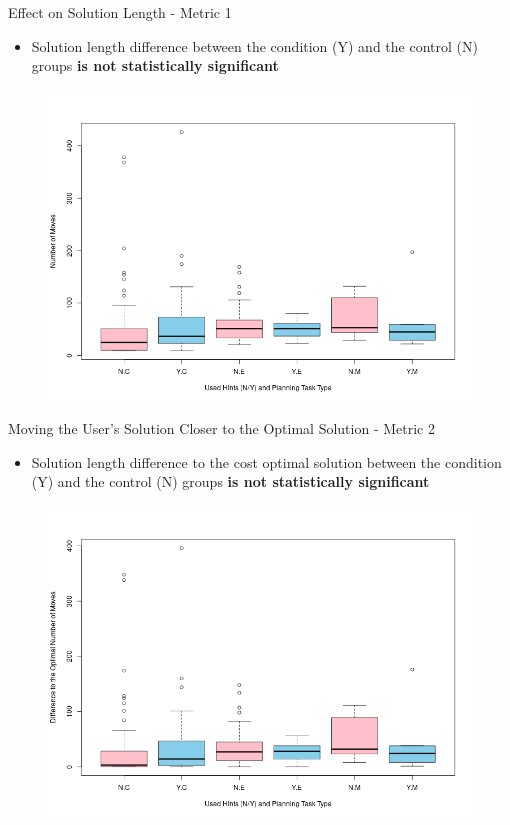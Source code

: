 \begin{frame}{Effect on Solution Length - Metric 1}

\begin{itemize}
\item Solution length difference between the condition (Y) and the control (N) groups \textbf{is not statistically significant}
\end{itemize}
\begin{figure}[tpb]
  \centering
\includegraphics[width=0.8\columnwidth]{../img/lenbytype.png}
  \label{fig:lenbytype}
\end{figure}

\end{frame}

\begin{frame}{Moving the User's Solution Closer to the Optimal Solution - Metric 2}

\begin{itemize}
\item Solution length difference to the cost optimal solution between the condition (Y) and the control (N) groups \textbf{is not statistically significant}
\end{itemize}
\begin{figure}[tpb]
  \centering
\includegraphics[width=0.7\columnwidth]{../img/lenoptbytype.png}
  \label{fig:lenoptbytype}
\end{figure}

\end{frame}

